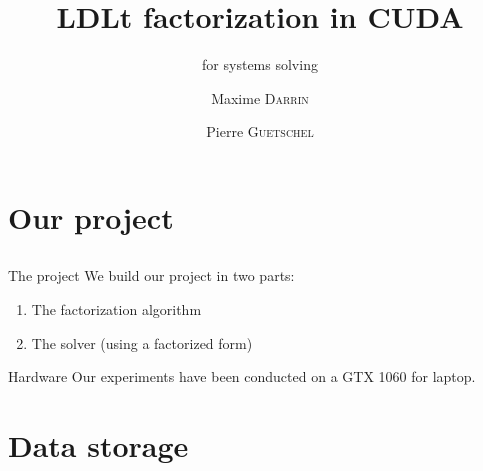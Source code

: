 \documentclass[compress,xcolor=table]{beamer}
\title{LDLt factorization in CUDA}
\subtitle{for systems solving} %
\date{\formatdate{22}{03}{2020}}
\author{Maxime \textsc{Darrin} \and Pierre \textsc{Guetschel}}
\institute{M2A - Sorbonne Université} %
\begin{document}
\begin{frame}[plain]
	\titlepage
\end{frame}

\section{Our project} \subsection{}

\begin{frame}
	
	\begin{block}{The project}
		We build our project in two parts:
		\begin{enumerate}
			\item The factorization algorithm
			\item The solver (using a factorized form)
		\end{enumerate}
	\end{block}

	\begin{exampleblock}{Hardware}
		Our experiments have been conducted on a GTX 1060 for laptop.
	\end{exampleblock}

\end{frame}



\section{Data storage}
\end{document}
